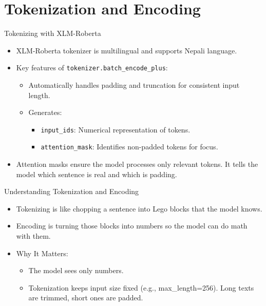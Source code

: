\documentclass[aspectratio=169]{beamer}
\begin{document}
\section{Tokenization and Encoding}
\begin{frame}{Tokenizing with XLM-Roberta}
  \begin{itemize}
    \item XLM-Roberta tokenizer is multilingual and supports Nepali language.
    \item Key features of \texttt{tokenizer.batch\_encode\_plus}:
          \begin{itemize}
            \item Automatically handles padding and truncation for consistent input length.
            \item Generates:
                  \begin{itemize}
                    \item \texttt{input\_ids}: Numerical representation of tokens.
                    \item \texttt{attention\_mask}: Identifies non-padded tokens for focus.
                  \end{itemize}
          \end{itemize}
    \item Attention masks ensure the model processes only relevant tokens. It tells the model which sentence is real and which is padding.
  \end{itemize}
\end{frame}
\begin{frame}{Understanding Tokenization and Encoding}
  \begin{itemize}
    \item Tokenizing is like chopping a sentence into Lego blocks that the model knows.
    \item Encoding is turning those blocks into numbers so the model can do math with them.
    \item Why It Matters:
          \begin{itemize}
            \item The model sees only numbers.
            \item Tokenization keeps input size fixed (e.g., max\_length=256). Long texts are trimmed, short ones are padded.
          \end{itemize}
  \end{itemize}
\end{frame}
\end{document}
